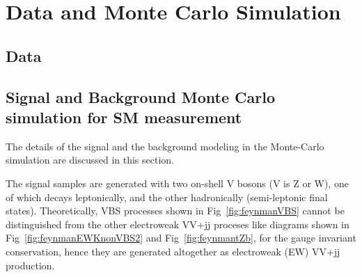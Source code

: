 \section{Data and Monte Carlo Simulation}
\subsection{Data}
\subsection{Signal and Background Monte Carlo simulation for SM measurement}
The details of the signal and the background modeling in the Monte-Carlo simulation are discussed in this section.

The signal samples are generated with two on-shell V bosons (V is Z or W), one of which decays leptonically, and the other hadronically (semi-leptonic final states).
Theoretically, VBS processes shown in Fig~\ref{fig:feynmanVBS} cannot be distinguished from the other electroweak VV+jj proceses like diagrams shown in Fig~\ref{fig:feynmanEWKnonVBS2} and Fig~\ref{fig:feynmantZb}, for the gauge invariant conservation, hence they are generated altogether as electroweak (EW) VV+jj production.


